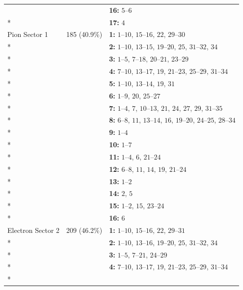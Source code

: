 \begin{longtable}{p{3.5cm}p{2.2cm}p{8.3cm}}
 &  & \textbf{16:} \mbox{$5$--$6$} \\*
 &  & \textbf{17:} \mbox{$4$} \\
\addlinespace
Pion Sector 1 & 185 (40.9\%) & \textbf{1:} \mbox{$1$--$10$}, \mbox{$15$--$16$}, \mbox{$22$}, \mbox{$29$--$30$} \\*
 &  & \textbf{2:} \mbox{$1$--$10$}, \mbox{$13$--$15$}, \mbox{$19$--$20$}, \mbox{$25$}, \mbox{$31$--$32$}, \mbox{$34$} \\*
 &  & \textbf{3:} \mbox{$1$--$5$}, \mbox{$7$--$18$}, \mbox{$20$--$21$}, \mbox{$23$--$29$} \\*
 &  & \textbf{4:} \mbox{$7$--$10$}, \mbox{$13$--$17$}, \mbox{$19$}, \mbox{$21$--$23$}, \mbox{$25$--$29$}, \mbox{$31$--$34$} \\*
 &  & \textbf{5:} \mbox{$1$--$10$}, \mbox{$13$--$14$}, \mbox{$19$}, \mbox{$31$} \\*
 &  & \textbf{6:} \mbox{$1$--$9$}, \mbox{$20$}, \mbox{$25$--$27$} \\*
 &  & \textbf{7:} \mbox{$1$--$4$}, \mbox{$7$}, \mbox{$10$--$13$}, \mbox{$21$}, \mbox{$24$}, \mbox{$27$}, \mbox{$29$}, \mbox{$31$--$35$} \\*
 &  & \textbf{8:} \mbox{$6$--$8$}, \mbox{$11$}, \mbox{$13$--$14$}, \mbox{$16$}, \mbox{$19$--$20$}, \mbox{$24$--$25$}, \mbox{$28$--$34$} \\*
 &  & \textbf{9:} \mbox{$1$--$4$} \\*
 &  & \textbf{10:} \mbox{$1$--$7$} \\*
 &  & \textbf{11:} \mbox{$1$--$4$}, \mbox{$6$}, \mbox{$21$--$24$} \\*
 &  & \textbf{12:} \mbox{$6$--$8$}, \mbox{$11$}, \mbox{$14$}, \mbox{$19$}, \mbox{$21$--$24$} \\*
 &  & \textbf{13:} \mbox{$1$--$2$} \\*
 &  & \textbf{14:} \mbox{$2$}, \mbox{$5$} \\*
 &  & \textbf{15:} \mbox{$1$--$2$}, \mbox{$15$}, \mbox{$23$--$24$} \\*
 &  & \textbf{16:} \mbox{$6$} \\
\addlinespace
Electron Sector 2 & 209 (46.2\%) & \textbf{1:} \mbox{$1$--$10$}, \mbox{$15$--$16$}, \mbox{$22$}, \mbox{$29$--$31$} \\*
 &  & \textbf{2:} \mbox{$1$--$10$}, \mbox{$13$--$16$}, \mbox{$19$--$20$}, \mbox{$25$}, \mbox{$31$--$32$}, \mbox{$34$} \\*
 &  & \textbf{3:} \mbox{$1$--$5$}, \mbox{$7$--$21$}, \mbox{$24$--$29$} \\*
 &  & \textbf{4:} \mbox{$7$--$10$}, \mbox{$13$--$17$}, \mbox{$19$}, \mbox{$21$--$23$}, \mbox{$25$--$29$}, \mbox{$31$--$34$} \\*

\end{longtable}

